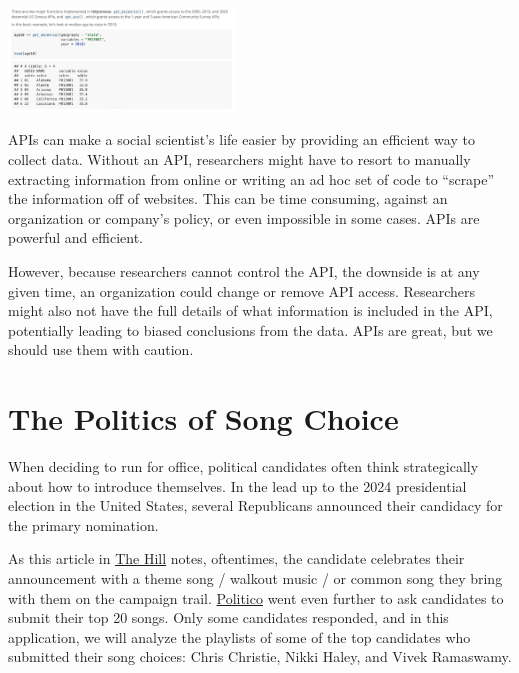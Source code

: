 \documentclass[
  letterpaper,
  DIV=11,
  numbers=noendperiod]{scrreprt}
\begin{document}
\includegraphics[width=0.45\textwidth,height=\textheight]{images/tidycensus.png}

APIs can make a social scientist's life easier by providing an efficient
way to collect data. Without an API, researchers might have to resort to
manually extracting information from online or writing an ad hoc set of
code to ``scrape'' the information off of websites. This can be time
consuming, against an organization or company's policy, or even
impossible in some cases. APIs are powerful and efficient.

However, because researchers cannot control the API, the downside is at
any given time, an organization could change or remove API access.
Researchers might also not have the full details of what information is
included in the API, potentially leading to biased conclusions from the
data. APIs are great, but we should use them with caution.

\hypertarget{the-politics-of-song-choice}{%
\section{The Politics of Song
Choice}\label{the-politics-of-song-choice}}

When deciding to run for office, political candidates often think
strategically about how to introduce themselves. In the lead up to the
2024 presidential election in the United States, several Republicans
announced their candidacy for the primary nomination.

As this article in
\href{https://thehill.com/blogs/in-the-know/4189303-mr-brightside-shake-it-off-jolene-among-2024-candidates-favorite-songs/}{The
Hill} notes, oftentimes, the candidate celebrates their announcement
with a theme song / walkout music / or common song they bring with them
on the campaign trail.
\href{https://www.politico.com/news/magazine/2023/09/06/top-20-songs-chris-christie-nikki-haley-will-hurd-cornel-west-00113795}{Politico}
went even further to ask candidates to submit their top 20 songs. Only
some candidates responded, and in this application, we will analyze the
playlists of some of the top candidates who submitted their song
choices: Chris Christie, Nikki Haley, and Vivek Ramaswamy.
\end{document}
